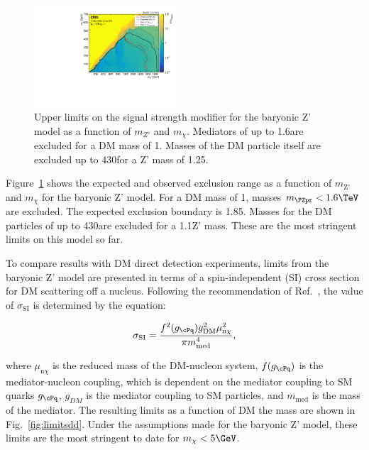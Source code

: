 \begin{figure}[htbp]
  \centering
  \includegraphics[width=0.475\textwidth]{figures/limits/limit2d_zpb_monohbb_.pdf}
  \caption{Upper limits on the signal strength modifier for the baryonic Z' model  as a function of $m_{Z'}$ and $m_\chi$. Mediators of up to 1.6\TeV are excluded for a DM mass of 1\GeV. Masses of the DM particle itself are excluded up to 430\GeV for a Z' mass of 1.25\TeV.}
  \label{fig:limits}
\end{figure}




Figure~\ref{fig:limits} shows the expected and observed exclusion range as a function of $m_{\text{Z}'}$ and $m_{\chi}$ for the baryonic Z' model. For a DM mass of 1\GeV, masses $\mzp<1.6\TeV$ are excluded. The expected exclusion boundary is 1.85\TeV. Masses for the DM particles of up to 430\GeV are excluded for a 1.1\TeV Z' mass. These are the most stringent limits on this model so far. %

To compare results with DM direct detection experiments, limits from the baryonic Z' model are presented in terms of a spin-independent (SI) cross section \SigSI for DM scattering off a nucleus.
Following the recommendation of Ref.~\cite{presentDM}, the value of $\sigma_\text{SI}$ is determined by the equation:

\begin{equation}
\sigma_\text{SI} = \frac{f^2(g_{\cPq})g^2_{\mathrm{DM}}\mu^2_{\mathrm{n}\chi}}{\pi m^4_{\mathrm{med}}},
\end{equation}

where $\mu_{\mathrm{n}\chi}$ is the reduced mass of the DM-nucleon system, $f(g_{\cPq})$ is the mediator-nucleon coupling, which is dependent on the mediator coupling to SM quarks $g_{\cPq}$, $g_{DM}$ is the mediator coupling to SM particles, and $m_{\text{med}}$ is the mass of the mediator.
The resulting \SigSI limits as a function of DM the mass are shown in Fig.~\ref{fig:limitsdd}.
Under the assumptions made for the baryonic Z' model, these limits are the most stringent to date for $m_\chi < 5\GeV$.


